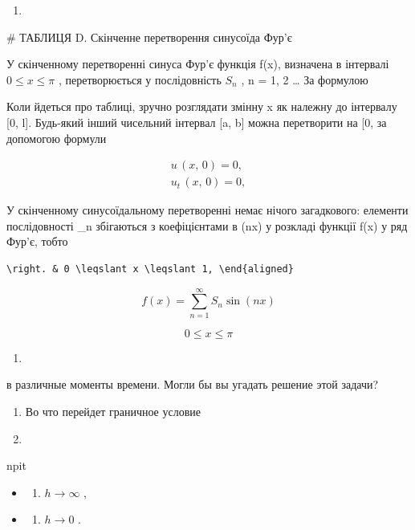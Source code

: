 \documentclass[
  ukrainian,
]{article}
\providecommand{\tightlist}{%
  \setlength{\itemsep}{0pt}\setlength{\parskip}{0pt}}
\begin{document}
\begin{enumerate}
\def\labelenumi{\arabic{enumi}.}
\tightlist
\item
\end{enumerate}

\# ТАБЛИЦЯ D. Скінченне перетворення синусоїда Фур'є

У скінченному перетворенні синуса Фур'є функція f(x), визначена в
інтервалі \(0 \le x \le \pi\) , перетворюється у послідовність \(S_n\) ,
n = 1, 2 \ldots{} За формулою

Коли йдеться про таблиці, зручно розглядати змінну x як належну до
інтервалу {[}0, l{]}. Будь-який інший чисельний інтервал {[}a, b{]}
можна перетворити на {[}0, \pi{]} за допомогою формули

\[
\begin{aligned} u \, (x, \, 0) = 0, \\ u_{t} \, (x, \, 0) = 0, \end{aligned}
\]

У скінченному синусоїдальному перетворенні немає нічого загадкового:
елементи послідовності \_n збігаються з коефіцієнтами в
\sin(nx) у розкладі функції f(x) у ряд Фур'є, тобто

\begin{verbatim}
\right. & 0 \leqslant x \leqslant 1, \end{aligned}
\end{verbatim}

\[
f(x) = \sum_{n=1}^{\infty} S_n \sin(nx)
\]

\[
0 \le x \le \pi
\]

\begin{enumerate}
\def\labelenumi{\arabic{enumi}.}
\tightlist
\item
\end{enumerate}

в различные моменты времени. Могли бы вы угадать решение этой задачи?

\begin{enumerate}
\def\labelenumi{\arabic{enumi}.}
\setcounter{enumi}{2}
\item
  Во что перейдет граничное условие
\item
\end{enumerate}

npit

\begin{itemize}
\tightlist
\item
  \begin{enumerate}
  \def\labelenumi{\alph{enumi})}
  \tightlist
  \item
    \(h \rightarrow \infty\) ,
  \end{enumerate}
\item
  \begin{enumerate}
  \def\labelenumi{\arabic{enumi})}
  \setcounter{enumi}{5}
  \tightlist
  \item
    \(h \rightarrow 0\) .
  \end{enumerate}
\end{itemize}
\end{document}
